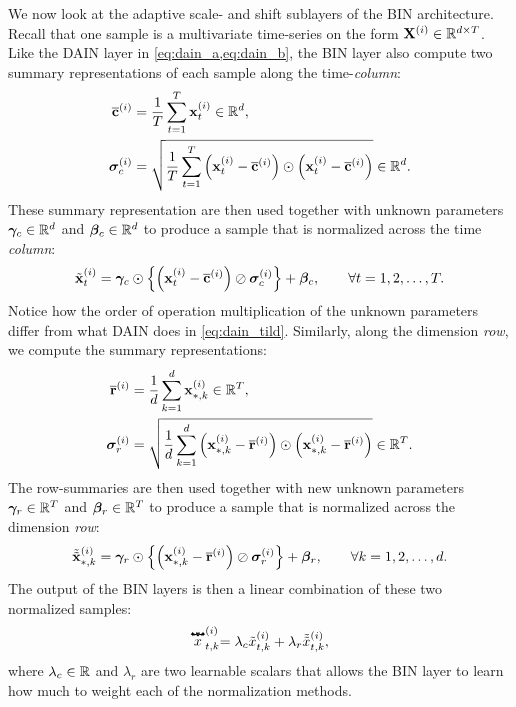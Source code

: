 \documentclass{statsmsc}
\begin{document}
{We now look at the adaptive scale- and shift sublayers of the \ac{BIN} architecture.
Recall that one sample is a multivariate time-series on the form $\mathbf{X}^{(i)} \in \mathbb{R}^{d \times T}$.
Like the \ac{DAIN} layer in \cref{eq:dain_a,eq:dain_b}, the \ac{BIN} layer also
compute two summary representations of each sample along the time-\textit{column}:
\begin{align}
    \overline{\mathbf{c}}^{(i)}& =\frac{1}{T} \sum^{T}_{t=1} \mathbf{x}_t^{(i)} \in \mathbb{R}^d, \\
    \bm\sigma_c^{(i)}&=\sqrt{
    \frac{1}{T} \sum^{T}_{t=1} \left(\mathbf{x}^{(i)}_{t} - \overline{\mathbf{c}}^{(i)} \right)
    \odot \left(\mathbf{x}^{(i)}_{t} - \overline{\mathbf{c}}^{(i)} \right)
} \in \mathbb{R}^d.
\end{align}
These summary representation are then used together with unknown parameters
$\bm\gamma_c \in \mathbb{R}^d$ and $\bm\beta_c \in \mathbb{R}^d$ to produce a sample that is normalized across
the time \textit{column}:
\begin{equation}
    \tilde{\mathbf{x}}^{(i)}_t= \bm\gamma_c \odot \left\{
        \left(\mathbf{x}^{(i)}_t - \overline{\mathbf{c}}^{(i)}\right)\oslash \bm\sigma_c^{(i)}
    \right\}+\bm\beta_c, \qquad \forall t=1,2,\dots,T.
\end{equation}
Notice how the order of operation multiplication of the unknown parameters differ from what
\ac{DAIN} does in \cref{eq:dain_tild}. Similarly, along the dimension \textit{row}, we compute
the summary representations:
\begin{align}
    \overline{\mathbf{r}}^{(i)}& =\frac{1}{d} \sum^{d}_{k=1} \mathbf{x}_{*,k}^{(i)} \in \mathbb{R}^T, \\
    \bm\sigma_r^{(i)}&=\sqrt{
        \frac{1}{d} \sum^{d}_{k=1} \left(\mathbf{x}^{(i)}_{*,k} - \overline{\mathbf{r}}^{(i)} \right)
        \odot \left(\mathbf{x}^{(i)}_{*,k} - \overline{\mathbf{r}}^{(i)} \right)
    } \in \mathbb{R}^T.
\end{align}
The row-summaries are then used together with new unknown parameters
$\bm\gamma_r \in \mathbb{R}^T$ and $\bm\beta_r \in \mathbb{R}^T$ to produce
a sample that is normalized across the dimension \textit{row}:
\begin{equation}
    \tilde{\tilde{\mathbf{x}}}^{(i)}_{*,k}= \bm\gamma_r \odot \left\{
        \left(\mathbf{x}^{(i)}_{*,k} - \overline{\mathbf{r}}^{(i)}\right)\oslash \bm\sigma_r^{(i)}
    \right\}+\bm\beta_r, \qquad \forall k=1,2,\dots,d.
\end{equation}
The output of the \ac{BIN} layers is then a linear combination of these two normalized samples:
\begin{equation}
    \stackrel{\mathbat}{x}^{(i)}_{t,k} = \lambda_c \tilde{x}^{(i)}_{t,k}
    + \lambda_r \tilde{\tilde{x}}^{(i)}_{t,k},
\end{equation}
where $\lambda_c \in \mathbb{R}$ and $\lambda_r$ are two learnable scalars that allows the \ac{BIN} layer
to learn how much to weight each of the normalization methods.


}
\end{document}
